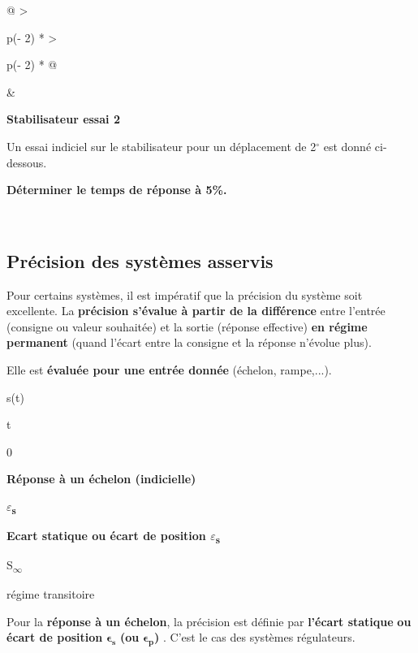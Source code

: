 \begin{longtable}[]{@{}
  >{\raggedright\arraybackslash}p{(\columnwidth - 2\tabcolsep) * }
  >{\raggedright\arraybackslash}p{(\columnwidth - 2\tabcolsep) * }@{}}
\toprule\noalign{}
\begin{minipage}[b]{\linewidth}\raggedright
\begin{quote}
\end{quote}
\end{minipage} & \begin{minipage}[b]{\linewidth}\raggedright
\textbf{Stabilisateur essai 2}

Un essai indiciel sur le stabilisateur pour un déplacement de 2$^\circ$ est
donné ci-dessous.


\textbf{Déterminer le temps de réponse à 5\%.}
\end{minipage} \\
\midrule\noalign{}
\endhead
\bottomrule\noalign{}
\endlastfoot
\end{longtable}

\subsection{Précision des systèmes
asservis}\label{pruxe9cision-des-systuxe8mes-asservis}

Pour certains systèmes, il est impératif que la précision du système
soit excellente. La \textbf{précision s'évalue à partir de la
différence} entre l'entrée (consigne ou valeur souhaitée) et la sortie
(réponse effective) \textbf{en régime permanent} (quand l'écart entre la
consigne et la réponse n'évolue plus).

Elle est \textbf{évaluée pour une entrée donnée} (échelon, rampe,...).

s(t)

t

0

\textbf{Réponse à un échelon (indicielle)}

\textbf{$\varepsilon$\textsubscript{s}}

\textbf{Ecart statique ou écart de position $\varepsilon$\textsubscript{s}}

S\textsubscript{$\infty$}

régime transitoire

Pour la \textbf{réponse à un échelon}, la précision est définie par
\textbf{l'écart statique} \textbf{ou écart de position}
\(\mathbf{\epsilon}_{\mathbf{s}}\) \textbf{(ou}
\(\mathbf{\epsilon}_{\mathbf{p}}\)\textbf{)} . C'est le cas des systèmes
régulateurs.

